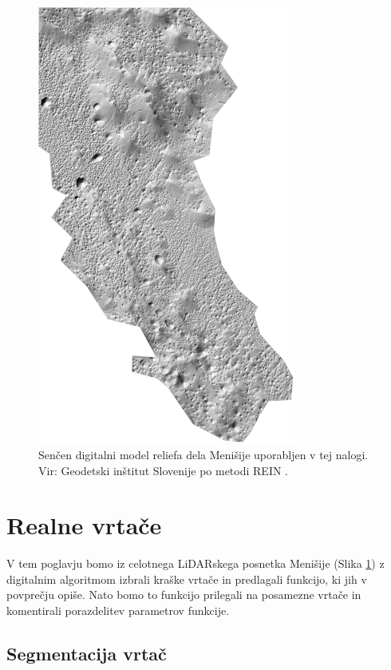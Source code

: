 \documentclass[a4paper, twoside, 12pt]{book}
\begin{document}
 \begin{figure}[h!]
    \begin{center}
      \includegraphics[width=8.5cm]{slike/menisija-relief}
    \end{center}
    \caption{Senčen digitalni model reliefa dela Menišije uporabljen v tej nalogi. Vir: Geodetski inštitut Slovenije \cite{LAK} po metodi REIN \cite{Kobler20079}.}
    \label{fig:menisija-relief}
  \end{figure} 

  \chapter{Realne vrtače}
  \label{realne-vrtace}

V tem poglavju bomo iz celotnega LiDARskega posnetka Menišije (Slika \ref{fig:menisija-relief}) z digitalnim algoritmom izbrali kraške vrtače in predlagali funkcijo, ki jih v povprečju opiše. Nato bomo to funkcijo prilegali na posamezne vrtače in komentirali porazdelitev parametrov funkcije.

  \section{Segmentacija vrtač}
\end{document}
